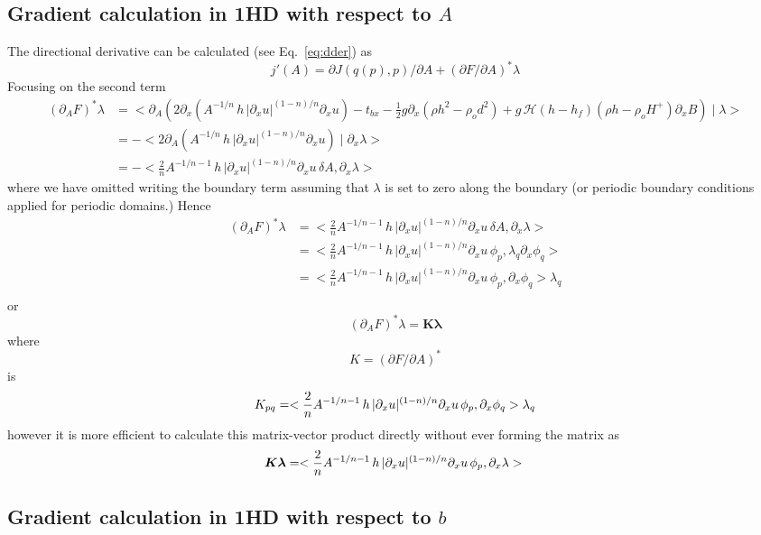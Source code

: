 \documentclass[10pt,a4paper]{book}
\newcommand{\He}{\mathcal{H}}
\newcommand{\p}{\partial}
\newcommand{\tbx}{t_{bx}}
\begin{document}
\subsection{Gradient calculation in 1HD with respect to $A$}


The directional derivative can be calculated (see Eq.~\ref{eq:dder}) as
\begin{equation}
j'(A)= \p J(q(p),p)/ \p A + (\p F / \p A)^\ast  \lambda
\label{eq:dder2}
\end{equation}
Focusing on the second term
\begin{align*}
  (\p_A F )^\ast  \lambda & = <\p_A  \left ( 2 \p_x ( A^{-1/n} \, h \, | \p_x u|^{(1-n)/n}   \p_x u ) - \tbx - \frac{1}{2} g \p_x (\rho h^2 - \rho_o d^2)+ g\,\He(h-h_f) (\rho h -\rho_o H^{+}) \p_x B \right )\mid \lambda>\\
                             & = - <  2 \p_A \left ( A^{-1/n} \, h \, | \p_x u|^{(1-n)/n}   \p_x u \right )\mid \p_x \lambda>\\
                             & = - <  \frac{2}{n}  A^{-1/n-1} \, h \, | \p_x u|^{(1-n)/n}   \p_x u \, \delta A, \p_x \lambda>
\end{align*}
where we have omitted writing the boundary term assuming that
$\lambda$ is set to zero along the boundary (or periodic boundary
conditions applied for periodic domains.)
Hence
\begin{align*}
  (\p_A F )^{\ast} \lambda &= <  \frac{2}{n}  A^{-1/n-1} \, h \, | \p_x u|^{(1-n)/n}   \p_x u \, \delta A, \p_x \lambda> \\
            &=    <  \frac{2}{n}  A^{-1/n-1} \, h \, | \p_x u|^{(1-n)/n}   \p_x u \, \phi_p, \lambda_q \p_x \phi_q> \\
            &=    <  \frac{2}{n}  A^{-1/n-1} \, h \, | \p_x u|^{(1-n)/n}   \p_x u \, \phi_p, \p_x \phi_q>  \lambda_q \\
\end{align*}
or
 \[
 (\p_A F )^{\ast} \lambda = \bm{K} \bm{\lambda}
\]
where
\[
K= (\p F /\p A)^{\ast} 
\]
is
\[
K_{pq}=<  \frac{2}{n}  A^{-1/n-1} \, h \, | \p_x u|^{(1-n)/n}   \p_x u \, \phi_p,  \p_x \phi_q>  \lambda_q \\
\]
however it is more efficient to calculate this matrix-vector product
directly without ever forming the matrix as
\[
  \bm{K} \bm{\lambda}= <  \frac{2}{n}  A^{-1/n-1} \, h \, | \p_x u|^{(1-n)/n}   \p_x u \, \phi_p, \p_x \lambda> \\
\]



\subsection{Gradient calculation in 1HD with respect to $b$}
\end{document}
